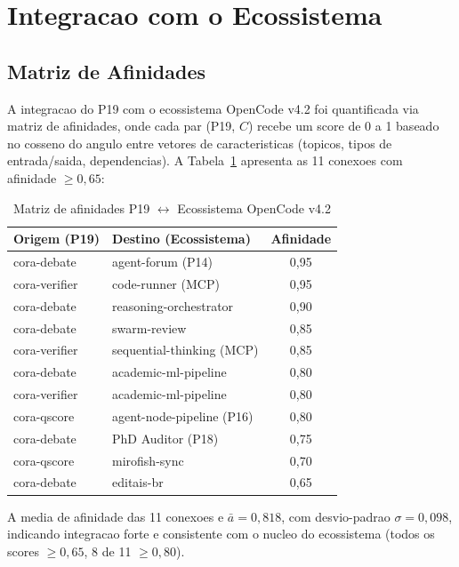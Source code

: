\documentclass[5p]{elsarticle}
\begin{document}
\section{Integracao com o Ecossistema}

\subsection{Matriz de Afinidades}

A integracao do P19 com o ecossistema OpenCode v4.2 foi quantificada via matriz de afinidades, onde cada par (P19, $C$) recebe um score de 0 a 1 baseado no cosseno do angulo entre vetores de caracteristicas (topicos, tipos de entrada/saida, dependencias). A Tabela~\ref{tab:afin} apresenta as 11 conexoes com afinidade $\geq 0,65$:

\begin{table}[H]
  \centering
  \caption{Matriz de afinidades P19 $\leftrightarrow$ Ecossistema OpenCode v4.2}
  \label{tab:afin}
  \begin{tabular}{llc}
    \toprule
    \textbf{Origem (P19)} & \textbf{Destino (Ecossistema)} & \textbf{Afinidade} \\
    \midrule
    cora-debate & agent-forum (P14) & 0,95 \\
    cora-verifier & code-runner (MCP) & 0,95 \\
    cora-debate & reasoning-orchestrator & 0,90 \\
    cora-debate & swarm-review & 0,85 \\
    cora-verifier & sequential-thinking (MCP) & 0,85 \\
    cora-debate & academic-ml-pipeline & 0,80 \\
    cora-verifier & academic-ml-pipeline & 0,80 \\
    cora-qscore & agent-node-pipeline (P16) & 0,80 \\
    cora-debate & PhD Auditor (P18) & 0,75 \\
    cora-qscore & mirofish-sync & 0,70 \\
    cora-debate & editais-br & 0,65 \\
    \bottomrule
  \end{tabular}
\end{table}

A media de afinidade das 11 conexoes e $\bar{a} = 0,818$, com desvio-padrao $\sigma = 0,098$, indicando integracao forte e consistente com o nucleo do ecossistema (todos os scores $\geq 0,65$, 8 de 11 $\geq 0,80$).
\end{document}
